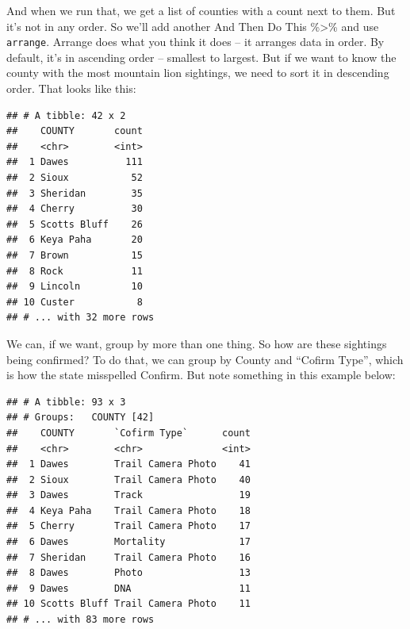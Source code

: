 \documentclass[]{book}
\newenvironment{Shaded}{\begin{snugshade}}{\end{snugshade}}
\newcommand{\DataTypeTok}[1]{\textcolor[rgb]{0.13,0.29,0.53}{#1}}
\newcommand{\KeywordTok}[1]{\textcolor[rgb]{0.13,0.29,0.53}{\textbf{#1}}}
\newcommand{\NormalTok}[1]{#1}
\newcommand{\OperatorTok}[1]{\textcolor[rgb]{0.81,0.36,0.00}{\textbf{#1}}}
\newcommand{\StringTok}[1]{\textcolor[rgb]{0.31,0.60,0.02}{#1}}
\begin{document}
And when we run that, we get a list of counties with a count next to them. But it's not in any order. So we'll add another And Then Do This \%\textgreater{}\% and use \texttt{arrange}. Arrange does what you think it does -- it arranges data in order. By default, it's in ascending order -- smallest to largest. But if we want to know the county with the most mountain lion sightings, we need to sort it in descending order. That looks like this:

\begin{Shaded}
\end{Shaded}

\begin{verbatim}
## # A tibble: 42 x 2
##    COUNTY       count
##    <chr>        <int>
##  1 Dawes          111
##  2 Sioux           52
##  3 Sheridan        35
##  4 Cherry          30
##  5 Scotts Bluff    26
##  6 Keya Paha       20
##  7 Brown           15
##  8 Rock            11
##  9 Lincoln         10
## 10 Custer           8
## # ... with 32 more rows
\end{verbatim}

We can, if we want, group by more than one thing. So how are these sightings being confirmed? To do that, we can group by County and ``Cofirm Type'', which is how the state misspelled Confirm. But note something in this example below:

\begin{Shaded}
\end{Shaded}

\begin{verbatim}
## # A tibble: 93 x 3
## # Groups:   COUNTY [42]
##    COUNTY       `Cofirm Type`      count
##    <chr>        <chr>              <int>
##  1 Dawes        Trail Camera Photo    41
##  2 Sioux        Trail Camera Photo    40
##  3 Dawes        Track                 19
##  4 Keya Paha    Trail Camera Photo    18
##  5 Cherry       Trail Camera Photo    17
##  6 Dawes        Mortality             17
##  7 Sheridan     Trail Camera Photo    16
##  8 Dawes        Photo                 13
##  9 Dawes        DNA                   11
## 10 Scotts Bluff Trail Camera Photo    11
## # ... with 83 more rows
\end{verbatim}
\end{document}
